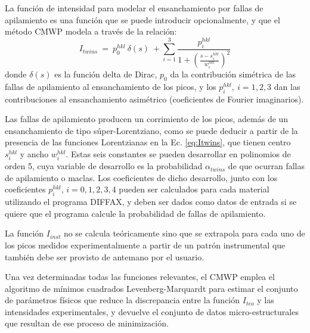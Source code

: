 La función de intensidad para modelar el ensanchamiento por fallas de apilamiento es una función que se puede introducir opcionalmente, y que el método CMWP modela a través de la relación\cite{Ribarik2008}:
\begin{equation}
  I_{twins} \ = \ p_0^{hkl} \ \delta(s) \ + \sum_{i=1}^{3} \frac{p_{i}^{hkl}}{1+\left( \frac{s - s_i^{hkl}}{w_i^{hkl}} \right)^2}
  \label{eq:Itwins}
\end{equation}
\noindent
donde $\delta(s)$ es la función delta de Dirac, $p_0$ da la contribución simétrica de las fallas de apilamiento al ensanchamiento de los picos, y los $p_i^{hkl}, \ i=1,2,3$ dan las contribuciones al ensanchamiento asimétrico (coeficientes de Fourier imaginarios).

Las fallas de apilamiento producen un corrimiento de los picos, además de un ensanchamiento de tipo súper-Lorentziano, como se puede deducir a partir de la presencia de las funciones Lorentzianas en la Ec. \ref{eq:Itwins}, que tienen centro $s_i^{hkl}$ y ancho $w_i^{hkl}$.
Estas seis constantes se pueden desarrollar en polinomios de orden 5, cuya variable de desarrollo es la probabilidad $\alpha_{twins}$ de que ocurran fallas de apilamiento o maclas\cite{Ribarik2008}.
Los coeficientes de dicho desarrollo, junto con los coeficientes $p_i^{hkl},\,i=0,1,2,3,4$ pueden ser calculados para cada material utilizando el programa DIFFAX\cite{Treacy1991}, y deben ser dados como datos de entrada si se quiere que el programa calcule la probabilidad de fallas de apilamiento.

La función $I_{inst}$ no se calcula teóricamente sino que se extrapola para cada uno de los picos medidos experimentalmente a partir de un patrón instrumental que también debe ser provisto de antemano por el usuario.

Una vez determinadas todas las funciones relevantes, el CMWP emplea el algoritmo de mínimos cuadrados Levenberg-Marquardt para estimar el conjunto de parámetros físicos que reduce la discrepancia entre la función $I_{teo}$ y las intensidades experimentales, y devuelve el conjunto de datos micro-estructurales que resultan de ese proceso de minimización.

